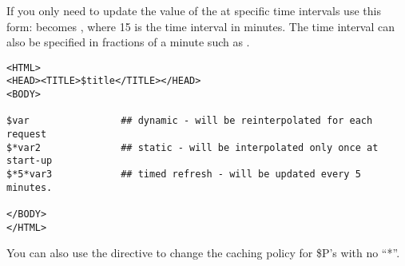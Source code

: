 If you only need to update the value of the  at specific time intervals use
this form:  becomes  , where 15 is the time interval in
minutes.  The time interval can also be specified in fractions of a minute such
as .

\begin{verbatim}
<HTML>
<HEAD><TITLE>$title</TITLE></HEAD>
<BODY>

$var                ## dynamic - will be reinterpolated for each request
$*var2              ## static - will be interpolated only once at start-up
$*5*var3            ## timed refresh - will be updated every 5 minutes.

</BODY>
</HTML>
\end{verbatim}

You can also use the  directive to change the
caching policy for \$P's with no ``*''.
